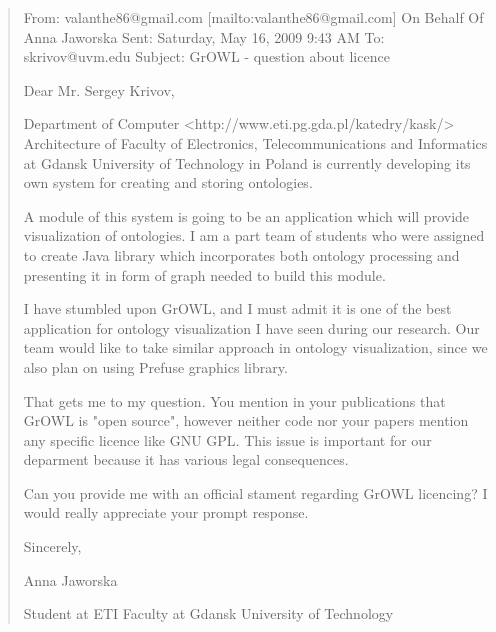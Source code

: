 \documentclass[a4paper,10pt]{article}
\begin{document}
\begin{quote}

From: valanthe86@gmail.com [mailto:valanthe86@gmail.com] On Behalf Of Anna Jaworska
Sent: Saturday, May 16, 2009 9:43 AM
To: skrivov@uvm.edu
Subject: GrOWL - question about licence


Dear Mr. Sergey Krivov,

Department of Computer <http://www.eti.pg.gda.pl/katedry/kask/>  Architecture of
Faculty of Electronics, Telecommunications and Informatics at Gdansk University of
Technology in Poland is currently developing its own system for creating and storing
ontologies.

A module of this system is going to be an application which will provide
visualization of ontologies. I am a part team of students who were assigned to
create Java library which incorporates both ontology processing and presenting it in
form of graph needed to build this module.

I have stumbled upon GrOWL, and I must admit it is one of the best application for
ontology visualization I have seen during our research. Our team would like to take
similar approach in ontology visualization, since we also plan on using Prefuse
graphics library.

That gets me to my question. You mention in your publications that GrOWL is "open
source", however neither code nor your papers mention any specific licence like GNU
GPL. This issue is important for our deparment because it has various legal
consequences.

Can you provide me with an official stament regarding GrOWL licencing? I would
really appreciate your prompt response.

Sincerely,

Anna Jaworska

Student at ETI Faculty at Gdansk University of Technology



\end{quote}
\newpage
\end{document}
